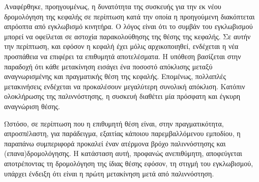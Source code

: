Αναφέρθηκε, προηγουμένως, η δυνατότητα της συσκευής για την εκ νέου δρομολόγηση
της κεφαλής σε περίπτωση κατά την οποία η προηγούμενη διακόπτεται απρόοπτα από
εγκλωβισμό κινητήρα. Ο λόγος είναι ότι το συμβάν του εγκλωβισμού μπορεί να
οφείλεται σε αστοχία παρακολούθησης της θέσης της κεφαλής. Σε αυτήν την
περίπτωση, και εφόσον η κεφαλή έχει μόλις αρχικοποιηθεί, ενδέχεται η νέα
προσπάθεια να επιφέρει τα επιθυμητά αποτελέσματα. Η υπόθεση βασίζεται στην
παραδοχή ότι κάθε μετακίνηση εισάγει ένα ποσοστό απόκλισης μεταξύ αναγνωρισμένης
και πραγματικής θέση της κεφαλής. Επομένως, πολλαπλές μετακινήσεις ενδέχεται
να προκαλέσουν μεγαλύτερη συνολική απόκλιση. Κατόπιν ολοκλήρωσης της
παλιννόστησης, η συσκευή διαθέτει μία πρόσφατη και έγκυρη αναγνώριση θέσης.

Ωστόσο, σε περίπτωση που η επιθυμητή θέση είναι, στην πραγματικότητα,
απροσπέλαστη, για παράδειγμα, εξαιτίας κάποιου παρεμβαλλόμενου εμποδίου, η
παραπάνω συμπεριφορά προκαλεί έναν ατέρμονα βρόχο παλιννόστησης και
(επανα)δρομολόγησης. Η κατάσταση αυτή, προφανώς ανεπιθύμητη, αποφεύγεται
αποτρέποντας τη δρομολόγηση της ίδιας θέσης εφόσον, τη στιγμή του εγκλωβισμού,
υπάρχει ένδειξη ότι είναι η πρώτη μετακίνηση μετά από παλιννόστηση.
